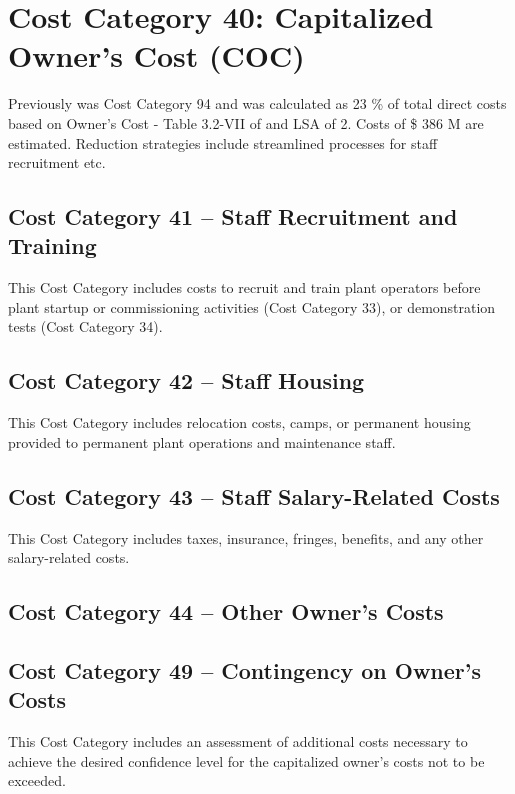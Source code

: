 \section{Cost Category 40: Capitalized Owner’s Cost (COC)}

Previously was Cost Category 94 and was calculated as 23 \% of total direct costs based on Owner's Cost - Table 3.2-VII of \cite{SCH78} and LSA of 2. Costs of \$ 386 M are estimated. Reduction strategies include streamlined processes for staff recruitment etc. 

\subsection*{Cost Category 41 – Staff Recruitment and Training}
This Cost Category includes costs to recruit and train plant operators before plant startup or commissioning activities (Cost Category 33), or demonstration tests (Cost Category 34).

\subsection*{Cost Category 42 – Staff Housing}
This Cost Category includes relocation costs, camps, or permanent housing provided to permanent plant operations and maintenance staff.

\subsection*{Cost Category 43 – Staff Salary-Related Costs}
This Cost Category includes taxes, insurance, fringes, benefits, and any other salary-related costs.

\subsection*{Cost Category 44 – Other Owner’s Costs}

\subsection*{Cost Category 49 – Contingency on Owner’s Costs}
This Cost Category includes an assessment of additional costs necessary to achieve the desired confidence level for the capitalized owner’s costs not to be exceeded.
